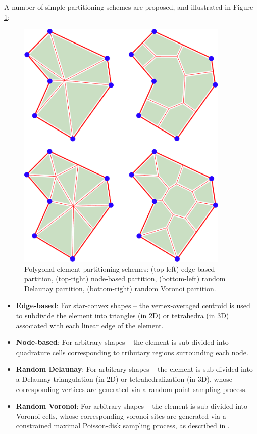 	A number of simple partitioning schemes are proposed, and illustrated in Figure \ref{fig:partitioning_types}:
	\begin{figure} [!ht]
		\centering
		\includegraphics[width = 4.0in]{figures/partition_types.pdf}
		\caption{Polygonal element partitioning schemes: (top-left) edge-based partition, (top-right) node-based partition, (bottom-left) random Delaunay partition, (bottom-right) random Voronoi partition.}
		\label{fig:partitioning_types}
	\end{figure}
	\begin{itemize}
		\item \textbf{Edge-based}: For star-convex shapes -- the vertex-averaged centroid is used to subdivide the element into triangles (in 2D) or tetrahedra (in 3D) associated with each linear edge of the element.
		\item \textbf{Node-based}: For arbitrary shapes -- the element is sub-divided into quadrature cells corresponding to tributary regions surrounding each node.
		\item \textbf{Random Delaunay}: For arbitrary shapes -- the element is sub-divided into a Delaunay triangulation (in 2D) or tetrahedralization (in 3D), whose corresponding vertices are generated via a random point sampling process.
		\item \textbf{Random Voronoi}: For arbitrary shapes -- the element is sub-divided into Voronoi cells, whose corresponding voronoi sites are generated via a constrained maximal Poisson-disk sampling process, as described in \cite{Ebeida:11}.
	\end{itemize}
	
